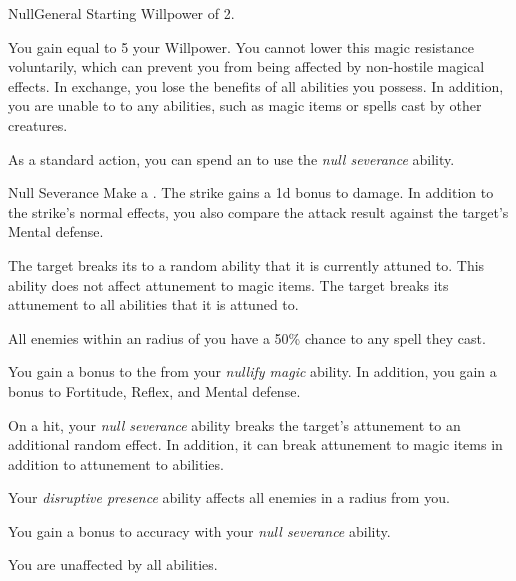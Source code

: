     \begin{feat}{Null}{General}
        \featpre Starting Willpower of 2.

         You gain  equal to 5 \add your Willpower.
        You cannot lower this magic resistance voluntarily, which can prevent you from being affected by non-hostile magical effects.
        In exchange, you lose the benefits of all  abilities you possess.
        In addition, you are unable to  to any  abilities, such as magic items or spells cast by other creatures.

         As a standard action, you can spend an  to use the \textit{null severance} ability.
        \begin{ability}{Null Severance}
            Make a .
            The strike gains a \plus1d bonus to damage.
            In addition to the strike's normal effects, you also compare the attack result against the target's Mental defense.

            \hit The target breaks its  to a random ability that it is currently attuned to.
            This ability does not affect attunement to magic items.
            \crit The target breaks its attunement to all abilities that it is attuned to.
        \end{ability}

         All enemies within an \areamed radius of you have a 50\% chance to  any spell they cast.

         You gain a  bonus to the  from your \textit{nullify magic} ability.
        In addition, you gain a  bonus to Fortitude, Reflex, and Mental defense.

         On a hit, your \textit{null severance} ability breaks the target's attunement to an additional random effect.
        In addition, it can break attunement to magic items in addition to attunement to abilities.

         Your \textit{disruptive presence} ability affects all enemies in a \arealarge radius  from you.

         You gain a  bonus to accuracy with your \textit{null severance} ability.

         You are unaffected by all  abilities.
    \end{feat}

